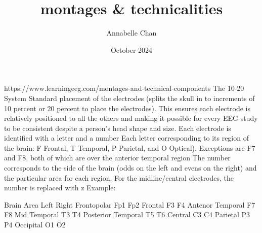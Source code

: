 \documentclass[12pt]{article}
\title{montages \& technicalities}
\author{Annabelle Chan}
\date{October 2024}
\begin{document}
\maketitle

https://www.learningeeg.com/montages-and-technical-components
The 10-20 System
Standard placement of the electrodes (splits the skull in to increments of 10 percent or 20 percent to place the electrodes). This ensures each electrode is relatively positioned to all the others and making it possible for every EEG study to be consistent despite a person’s head shape and size.
Each electrode is identified with a letter and a number 
Each letter corresponding to its region of the brain: F Frontal, T Temporal, P Parietal, and O Optical). Exceptions are F7 and F8, both of which are over the anterior temporal region 
The number corresponds to the side of the brain (odds on the left and evens on the right) and the particular area for each region. For the midline/central electrodes, the number is replaced with z
Example:


Brain Area
Left 
Right
Frontopolar 
Fp1
Fp2
Frontal
F3
F4
Antenor Temporal
F7
F8
Mid Temporal
T3
T4
Posterior Temporal
T5
T6
Central
C3
C4
Parietal
P3
P4
Occipital 
O1
O2
\end{document}
